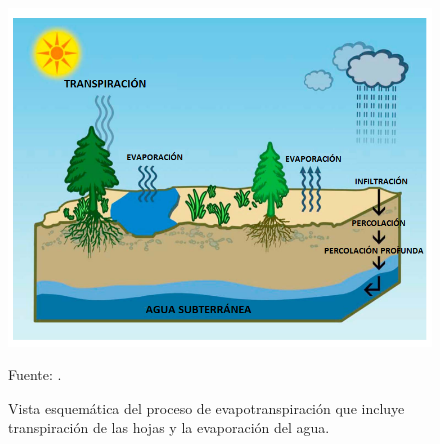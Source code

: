 \begin{figure}[ht!]
\centering
	\includegraphics[scale=0.75]{Images/wang02.png}
	\caption{Vista esquemática del proceso de evapotranspiración que incluye transpiración de las hojas y la evaporación del agua.}
	Fuente: \citet{wang2012review}.
	\label{fig:wang02}
\end{figure}